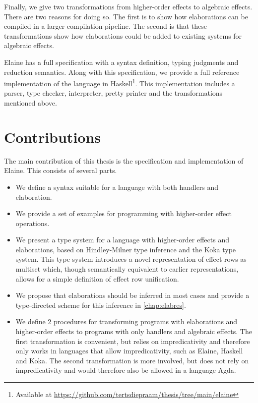 Finally, we give two transformations from higher-order effects to algebraic effects. There are two reasons for doing so. The first is to show how elaborations can be compiled in a larger compilation pipeline. The second is that these transformations show how elaborations could be added to existing systems for algebraic effects.

Elaine has a full specification with a syntax definition, typing judgments and reduction semantics. Along with this specification, we provide a full reference implementation of the language in Haskell\footnote{Available at \url{https://github.com/tertsdiepraam/thesis/tree/main/elaine}}. This implementation includes a parser, type checker, interpreter, pretty printer and the transformations mentioned above.

\section{Contributions}

The main contribution of this thesis is the specification and implementation of Elaine. This consists of several parts.

\begin{itemize}
    \item We define a syntax suitable for a language with both handlers and elaboration.
    \item We provide a set of examples for programming with higher-order effect operations.
    \item We present a type system for a language with higher-order effects and elaborations, based on Hindley-Milner type inference and the Koka type system. This type system introduces a novel representation of effect rows as multiset which, though semantically equivalent to earlier representations, allows for a simple definition of effect row unification.
    \item We propose that elaborations should be inferred in most cases and provide a type-directed scheme for this inference in \cref{chap:elabres}.
    \item We define 2 procedures for transforming programs with elaborations and higher-order effects to programs with only handlers and algebraic effects. The first transformation is convenient, but relies on impredicativity and therefore only works in languages that allow impredicativity, such as Elaine, Haskell and Koka. The second transformation is more involved, but does not rely on impredicativity and would therefore also be allowed in a language Agda.
\end{itemize}
